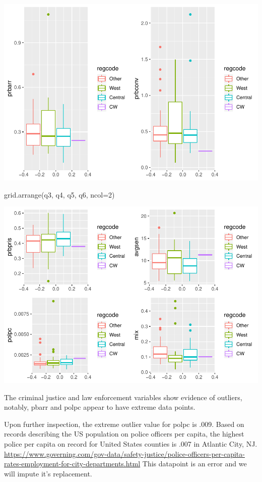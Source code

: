 \documentclass[]{article}
\newenvironment{Shaded}{}{}
\newcommand{\DataTypeTok}[1]{#1}
\newcommand{\DecValTok}[1]{#1}
\newcommand{\KeywordTok}[1]{\textcolor[rgb]{0.00,0.00,1.00}{#1}}
\newcommand{\NormalTok}[1]{#1}
\begin{document}
\includegraphics{Bagnard_Gaustad_Hartman_Leung_Lab_3_files/figure-latex/unnamed-chunk-22-1.pdf}

\begin{Shaded}
\begin{Highlighting}[]
\KeywordTok{grid.arrange}\NormalTok{(q3, q4, q5, q6, }\DataTypeTok{ncol=}\DecValTok{2}\NormalTok{)}
\end{Highlighting}
\end{Shaded}

\includegraphics{Bagnard_Gaustad_Hartman_Leung_Lab_3_files/figure-latex/unnamed-chunk-22-2.pdf}

The criminal justice and law enforcement variables show evidence of
outliers, notably, pbarr and polpc appear to have extreme data points.

Upon further inspection, the extreme outlier value for polpc is .009.
Based on records describing the US population on police officers per
capita, the highest police per capita on record for United States
counties is .007 in Atlantic City, NJ.
\url{https://www.governing.com/gov-data/safety-justice/police-officers-per-capita-rates-employment-for-city-departments.html}
This datapoint is an error and we will impute it's replacement.
\end{document}
